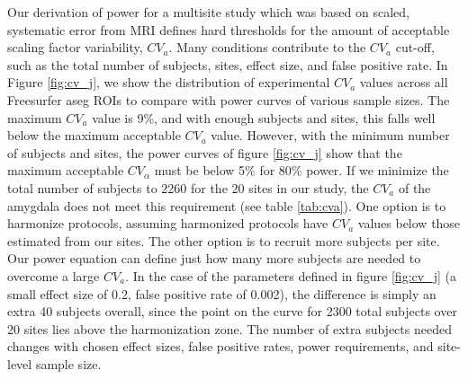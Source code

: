 Our derivation of power for a multisite study which was based on scaled, systematic error from MRI defines hard thresholds for the amount of acceptable scaling factor variability, $CV_{a}$. Many conditions contribute to the $CV_{a}$ cut-off, such as the total number of subjects, sites, effect size, and false positive rate. In Figure \ref{fig:cv_j}, we show the distribution of experimental $CV_{a}$ values across all Freesurfer aseg ROIs to compare with power curves of various sample sizes. The maximum $CV_{a}$ value is 9\%, and with enough subjects and sites, this falls well below the maximum acceptable $CV_{a}$ value. However, with the minimum number of subjects and sites, the power curves of figure \ref{fig:cv_j} show that the maximum acceptable $CV_{\alpha}$ must be below 5\% for 80\% power. If we minimize the total number of subjects to 2260 for the 20 sites in our study, the $CV_{a}$ of the amygdala does not meet this requirement (see table \ref{tab:cva}). One option is to harmonize protocols, assuming harmonized protocols have $CV_a$ values below those estimated from our sites. The other option is to recruit more subjects per site. Our power equation can define just how many more subjects are needed to overcome a large $CV_a$. In the case of the parameters defined in figure \ref{fig:cv_j} (a small effect size of 0.2, false positive rate of 0.002), the difference is simply an extra 40 subjects overall, since the point on the curve for 2300 total subjects over 20 sites lies above the harmonization zone. The number of extra subjects needed changes with chosen effect sizes, false positive rates, power requirements, and site-level sample size. 

